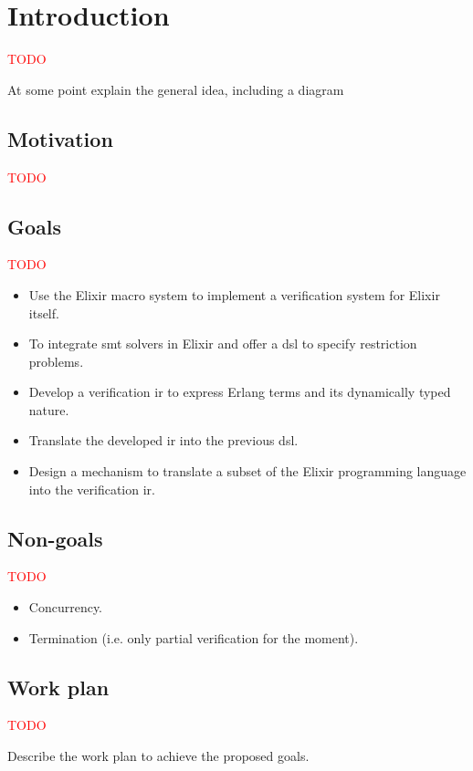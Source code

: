 \chapter{Introduction}
\label{cap:introduction}

\textcolor{red}{TODO}

At some point explain the general idea, including a diagram

\section{Motivation}

\textcolor{red}{TODO}

\section{Goals}

\textcolor{red}{TODO}

\begin{itemize}
  \item Use the Elixir macro system to implement a verification system 
    for Elixir itself.
  \item To integrate \acrshort{smt} solvers in Elixir and offer a \gls{dsl} 
    to specify restriction problems.
  \item Develop a verification \gls{ir} to express Erlang terms and its 
    dynamically typed nature.
  \item Translate the developed \gls{ir} into the previous \gls{dsl}.
  \item Design a mechanism to translate a subset of the Elixir 
    programming language into the verification \gls{ir}.
\end{itemize}

\section{Non-goals}

\textcolor{red}{TODO}

\begin{itemize}
  \item Concurrency.
  \item Termination (i.e. only partial verification for the moment).
\end{itemize}

\section{Work plan}

\textcolor{red}{TODO}

Describe the work plan to achieve the proposed goals.
